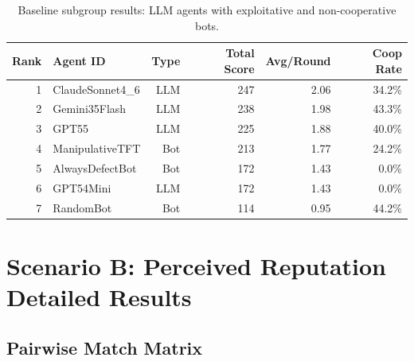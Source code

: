 \documentclass[11pt]{article}
\begin{document}
\begin{table}[H]
\centering
\caption{Baseline subgroup results: LLM agents with exploitative and non-cooperative bots.}
\label{tab:baseline_subgroup_llm_exploitative}
\begin{tabular}{rlrrrr}
\toprule
Rank & Agent ID & Type & Total Score & Avg/Round & Coop Rate \\
\midrule
1 & ClaudeSonnet4\_6 & LLM & 247 & 2.06 & 34.2\% \\
2 & Gemini35Flash & LLM & 238 & 1.98 & 43.3\% \\
3 & GPT55 & LLM & 225 & 1.88 & 40.0\% \\
4 & ManipulativeTFT & Bot & 213 & 1.77 & 24.2\% \\
5 & AlwaysDefectBot & Bot & 172 & 1.43 & 0.0\% \\
6 & GPT54Mini & LLM & 172 & 1.43 & 0.0\% \\
7 & RandomBot & Bot & 114 & 0.95 & 44.2\% \\
\bottomrule
\end{tabular}
\end{table}


\clearpage
\section{Scenario B: Perceived Reputation Detailed Results}
\label{app:reputation_details}

\subsection{Pairwise Match Matrix}
\end{document}
